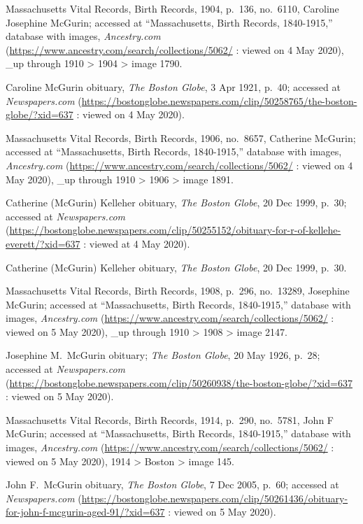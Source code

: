 \begin{thebibliography}{999}
Massachusetts Vital Records, Birth Records, 1904, p.\ 136, no.\ 6110, Caroline Josephine McGurin; accessed at ``Massachusetts, Birth Records, 1840-1915,'' database with images, \textit{Ancestry.com} (\url{https://www.ancestry.com/search/collections/5062/} : viewed on 4 May 2020), \_up through 1910 > 1904 > image 1790.

Caroline McGurin obituary, \textit{The Boston Globe}, 3 Apr 1921, p.\ 40; accessed at \textit{Newspapers.com} (\url{https://bostonglobe.newspapers.com/clip/50258765/the-boston-globe/?xid=637} : viewed on 4 May 2020).

Massachusetts Vital Records, Birth Records, 1906, no.\ 8657, Catherine McGurin; accessed at ``Massachusetts, Birth Records, 1840-1915,'' database with images, \textit{Ancestry.com} (\url{https://www.ancestry.com/search/collections/5062/} : viewed on 4 May 2020), \_up through 1910 > 1906 > image 1891.

Catherine (McGurin) Kelleher obituary, \textit{The Boston Globe}, 20 Dec 1999, p.\ 30; accessed at \textit{Newspapers.com} (\url{https://bostonglobe.newspapers.com/clip/50255152/obituary-for-r-of-kellehe-everett/?xid=637} : viewed at 4 May 2020).

Catherine (McGurin) Kelleher obituary, \textit{The Boston Globe}, 20 Dec 1999, p.\ 30.

Massachusetts Vital Records, Birth Records, 1908, p.\ 296, no.\ 13289, Josephine McGurin; accessed at ``Massachusetts, Birth Records, 1840-1915,'' database with images, \textit{Ancestry.com} (\url{https://www.ancestry.com/search/collections/5062/} : viewed on 5 May 2020), \_up through 1910 > 1908 > image 2147.

Josephine M.\ McGurin obituary; \textit{The Boston Globe}, 20 May 1926, p.\ 28; accessed at \textit{Newspapers.com} (\url{https://bostonglobe.newspapers.com/clip/50260938/the-boston-globe/?xid=637} : viewed on 5 May 2020).

Massachusetts Vital Records, Birth Records, 1914, p.\ 290, no.\ 5781, John F McGurin; accessed at ``Massachusetts, Birth Records, 1840-1915,'' database with images, \textit{Ancestry.com} (\url{https://www.ancestry.com/search/collections/5062/} : viewed on 5 May 2020), 1914 > Boston > image 145.

John F.\ McGurin obituary, \textit{The Boston Globe}, 7 Dec 2005, p.\ 60; accessed at \textit{Newspapers.com} (\url{https://bostonglobe.newspapers.com/clip/50261436/obituary-for-john-f-mcgurin-aged-91/?xid=637} : viewed on 5 May 2020).


\end{thebibliography}
